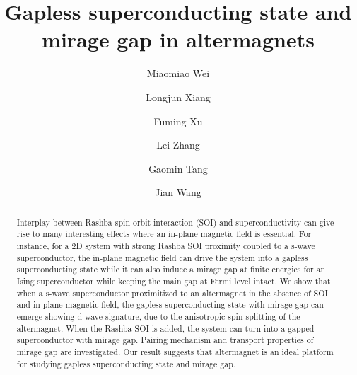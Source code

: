\documentclass[aps, prb, twocolumn, amssymb, amsmath, showpacs, superscriptaddress]{revtex4-1}
\begin{document}
\title{Gapless superconducting state and mirage gap in altermagnets}
\author{Miaomiao Wei}
\author{Longjun Xiang}
\author{Fuming Xu}
\author{Lei Zhang}
\author{Gaomin Tang}
\author{Jian Wang}

\begin{abstract}
Interplay between Rashba spin orbit interaction (SOI) and superconductivity can give rise to many interesting effects where an in-plane magnetic field is essential. For instance, for a 2D system with strong Rashba SOI proximity coupled to a s-wave superconductor, the in-plane magnetic field can drive the system into a gapless superconducting state while it can also induce a mirage gap at finite energies for an Ising superconductor while keeping the main gap at Fermi level intact. We show that when a s-wave superconductor proximitized to an altermagnet in the absence of SOI and in-plane magnetic field, the gapless superconducting state with mirage gap can emerge showing d-wave signature, due to the anisotropic spin splitting of the altermagnet. When the Rashba SOI is added, the system can turn into a gapped superconductor with mirage gap. Pairing mechanism and transport properties of mirage gap are investigated. Our result suggests that altermagnet is an ideal platform for studying gapless superconducting state and mirage gap.
\end{abstract}
\end{document}
